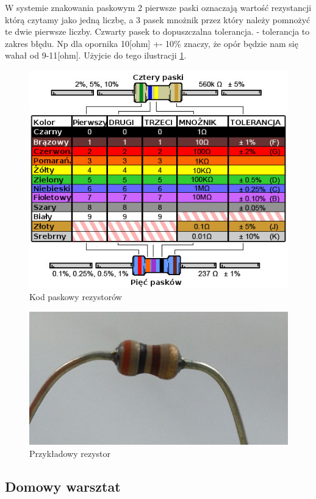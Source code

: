 \documentclass[a4paper,12pt, twoside]{article}
\begin{document}
W systemie znakowania paskowym 2 pierwsze paski oznaczają wartość rezystancji którą czytamy jako jedną liczbę, a 3 pasek mnożnik przez który należy pomnożyć te dwie pierwsze liczby.
Czwarty pasek to dopuszczalna tolerancja. - tolerancja to zakres błędu. Np dla opornika 10[ohm] +- 10\% znaczy, że opór będzie nam się wahał od 9-11[ohm]. Użyjcie do tego ilustracji \ref{fig:kod}.
\begin{figure}[h]
 \centering
  \includegraphics[scale=0.7]{kod_paskowy.jpg}
  \caption{Kod paskowy rezystorów}
  \label{fig:kod}
\end{figure}
\begin{figure}
 \centering
  \includegraphics[scale=0.4]{opornik.jpg}
  \caption{Przykładowy rezystor}
  \label{fig:rez_zad}
\end{figure}
\FloatBarrier
	\subsection {Domowy warsztat}
    
\end{document}
